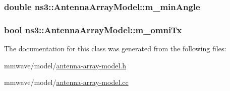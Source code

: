 \subsubsection[{\texorpdfstring{m\+\_\+min\+Angle}{m_minAngle}}]{\setlength{\rightskip}{0pt plus 5cm}double ns3\+::\+Antenna\+Array\+Model\+::m\+\_\+min\+Angle\hspace{0.3cm}{\ttfamily [private]}}\hypertarget{classns3_1_1AntennaArrayModel_a07697f3127921e2f89bbd4250a9ef731}{}\label{classns3_1_1AntennaArrayModel_a07697f3127921e2f89bbd4250a9ef731}
\subsubsection[{\texorpdfstring{m\+\_\+omni\+Tx}{m_omniTx}}]{\setlength{\rightskip}{0pt plus 5cm}bool ns3\+::\+Antenna\+Array\+Model\+::m\+\_\+omni\+Tx\hspace{0.3cm}{\ttfamily [private]}}\hypertarget{classns3_1_1AntennaArrayModel_aba61876be2ce48b14eda6aa791c15c39}{}\label{classns3_1_1AntennaArrayModel_aba61876be2ce48b14eda6aa791c15c39}


The documentation for this class was generated from the following files\+:\begin{DoxyCompactItemize}
\item 
mmwave/model/\hyperlink{antenna-array-model_8h}{antenna-\/array-\/model.\+h}\item 
mmwave/model/\hyperlink{antenna-array-model_8cc}{antenna-\/array-\/model.\+cc}\end{DoxyCompactItemize}
